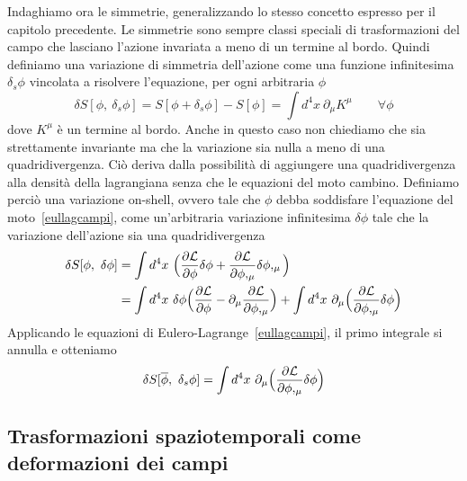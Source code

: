     Indaghiamo ora le simmetrie, generalizzando lo stesso concetto espresso per il capitolo precedente. Le simmetrie sono sempre classi speciali di trasformazioni del campo che lasciano l'azione invariata a meno di un termine al bordo. Quindi definiamo una variazione di simmetria dell'azione come una funzione infinitesima $\delta_s \phi$ vincolata a risolvere l'equazione, per ogni arbitraria $\phi$
    \begin{equation} \label{invazionecampi}
        \delta S[\phi, ~\delta_s \phi] = S[\phi + \delta_s \phi] - S[\phi] = \int d^4 x ~ \partial_\mu K^\mu \qquad \forall \phi
    \end{equation}  
    dove $K^\mu$ è un termine al bordo. Anche in questo caso non chiediamo che sia strettamente invariante ma che la variazione sia nulla a meno di una quadridivergenza. Ciò deriva dalla possibilità di aggiungere una quadridivergenza alla densità della lagrangiana senza che le equazioni del moto cambino. Definiamo perciò una variazione on-shell, ovvero tale che $\phi$ debba soddisfare l'equazione del moto~\eqref{eullagcampi}, come un'arbitraria variazione infinitesima $\delta \phi$ tale che la variazione dell'azione sia una quadridivergenza
    \begin{equation*}
    \begin{aligned}
        \delta S[\phi, ~\delta \phi] & = \int d^4 x ~ \Big(\frac{\partial\mathcal L}{\partial\phi} \delta \phi + \frac{\partial\mathcal L}{\partial\phi,_\mu} \delta \phi,_\mu \Big) \\ & = \int d^4 x ~ \delta \phi \Big (\frac{\partial\mathcal L}{\partial\phi} - \partial_\mu \frac{\partial\mathcal L}{\partial\phi,_\mu} \Big ) + \int d^4 x ~ \partial_\mu \Big ( \frac{\partial\mathcal L}{\partial\phi,_\mu}  \delta \phi \Big)
    \end{aligned}
    \end{equation*}
    Applicando le equazioni di Eulero-Lagrange~\eqref{eullagcampi}, il primo integrale si annulla e otteniamo 
    \begin{equation} \label{invonshellcampi}
        \delta S[\overline \phi, ~\delta_s \phi] = \int d^4 x ~ \partial_\mu \Big ( \frac{\partial\mathcal L}{\partial\phi,_\mu}  \delta \phi \Big)
    \end{equation}

\subsection{Trasformazioni spaziotemporali come deformazioni dei campi}

